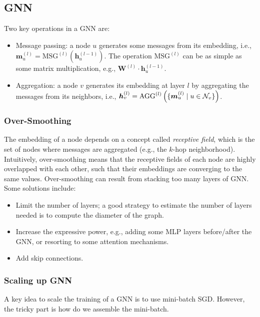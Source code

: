     \subsection{GNN}
        Two key operations in a GNN are:
        \begin{itemize}
            \item Message passing: a node $u$ generates some messages from its embedding, i.e., $\bm{m}_u^{(l)} = \text{MSG}^{(l)}(\bm{h}_u^{(l-1)})$. The operation $\text{MSG}^{(l)}$ can be as simple as some matrix multiplication, e.g., $\bm{W}^{(l)} \cdot \bm{h}^{(l-1)}_u$.
            \item Aggregation: a node $v$ generates its embedding at layer $l$ by aggregating the messages from its neighbors, i.e., $\bm{h}_v^{(l)} = \text{AGG}^{(l)}\left( \{ \bm{m}_u^{(l)}  \mid u \in \mathcal{N}_v \} \right)$.
        \end{itemize}
        
        \subsubsection{Over-Smoothing}
        The embedding of a node depends on a concept called \emph{receptive field}, which is the set of nodes where messages are aggregated (e.g., the $k$-hop neighborhood).
        Intuitively, over-smoothing means that the receptive fields of each node are highly overlapped with each other, such that their embeddings are converging to the same values.
        Over-smoothing can result from stacking too many layers of GNN.
        Some solutions include:
            \begin{itemize}
                \item Limit the number of layers; a good strategy to estimate the number of layers needed is to compute the diameter of the graph.
                \item Increase the expressive power, e.g., adding some MLP layers before/after the GNN, or resorting to some attention mechanisms.
                \item Add skip connections.
            \end{itemize}
        
        \subsubsection{Scaling up GNN}
            A key idea to scale the training of a GNN is to use mini-batch SGD.
            However, the tricky part is how do we assemble the mini-batch.
            
